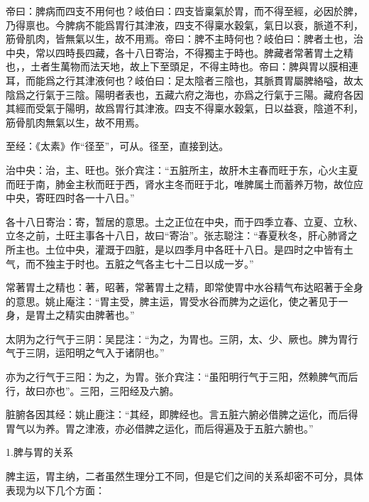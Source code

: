 \documentclass[12pt]{ctexbook}
\begin{document}

\begin{yuanwen}
帝曰：脾病而四支不用何也？岐伯曰：四支皆稟氣於胃，而不得至經，必因於脾，乃得禀也。今脾病不能爲胃行其津液，四支不得稟水穀氣，氣日以衰，脈道不利，筋骨肌肉，皆無氣以生，故不用焉。帝曰：脾不主時何也？岐伯曰：脾者土也，治中央，常以四時長四藏，各十八日寄治，不得獨主于時也。脾藏者常著胃土之精也，，土者生萬物而法天地，故上下至頭足，不得主時也。帝曰：脾與胃以膜相連耳，而能爲之行其津液何也？岐伯曰：足太陰者三陰也，其脈貫胃屬脾絡嗌，故太陰爲之行氣于三陰。陽明者表也，五藏六府之海也，亦爲之行氣于三陽。藏府各因其經而受氣于陽明，故爲胃行其津液。四支不得稟水穀氣，日以益衰，陰道不利，筋骨肌肉無氣以生，故不用焉。
\end{yuanwen}


\begin{jiaozhu}
  \item 至经：《太素》作“径至”，可从。径至，直接到达。
  \item 治中央：治，主、旺也。张介宾注：“五脏所主，故肝木主春而旺于东，心火主夏而旺于南，肺金主秋而旺于西，肾水主冬而旺于北，唯脾属土而蓄养万物，故位应中央，寄旺四时各一十八日。”
  \item 各十八日寄治：寄，暂居的意思。土之正位在中央，而于四季立春、立夏、立秋、立冬之前，土旺主事各十八日，故曰“寄治”。张志聪注：“春夏秋冬，肝心肺肾之所主也。土位中央，灌溉于四脏，是以四季月中各旺十八日。是四时之中皆有土气，而不独主于时也。五脏之气各主七十二日以成一岁。”
  \item 常著胃土之精也：著，昭著，常著胃土之精，即常使胃中水谷精气布达昭著于全身的意思。姚止庵注：“胃主受，脾主运，胃受水谷而脾为之运化，使之著见于一身，是胃土之精实由脾著也。”
  \item 太阴为之行气于三阴：吴昆注：“为之，为胃也。三阴，太、少、厥也。脾为胃行气于三阴，运阳明之气入于诸阴也。”
  \item 亦为之行气于三阳：为之，为胃。张介宾注：“虽阳明行气于三阳，然赖脾气而后行，故曰亦也”。三阳，三阳经及六腑。
  \item 脏腑各因其经：姚止鹿注：“其经，即脾经也。言五脏六腑必借脾之运化，而后得胃气以为养。胃之津液，亦必借脾之运化，而后得遍及于五脏六腑也。”
\end{jiaozhu}


1.脾与胃的关系

脾主运，胃主纳，二者虽然生理分工不同，但是它们之间的关系却密不可分，具体表现为以下几个方面：
\end{document}

